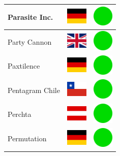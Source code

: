 \documentclass[12pt, a4paper, twoside]{report}
\begin{document}
\begin{center}
\begin{longtable}{|p{5cm}|p{2cm}|p{2cm}|}
 Parasite Inc.                                              & \includegraphics[width=1cm]{../img/flags/de} &   \includegraphics[width=1cm]{../likes/y} \\ \hline
 Party Cannon                                               & \includegraphics[width=1cm]{../img/flags/gb} &   \includegraphics[width=1cm]{../likes/y} \\ \hline
 Paxtilence                                                 & \includegraphics[width=1cm]{../img/flags/de} &   \includegraphics[width=1cm]{../likes/y} \\ \hline
 Pentagram Chile                                            & \includegraphics[width=1cm]{../img/flags/cl} &   \includegraphics[width=1cm]{../likes/y} \\ \hline
 Perchta                                                    & \includegraphics[width=1cm]{../img/flags/at} &   \includegraphics[width=1cm]{../likes/y} \\ \hline
 Permutation                                                & \includegraphics[width=1cm]{../img/flags/de} &   \includegraphics[width=1cm]{../likes/y} \\ \hline

\end{longtable}
\end{center}
\end{document}
